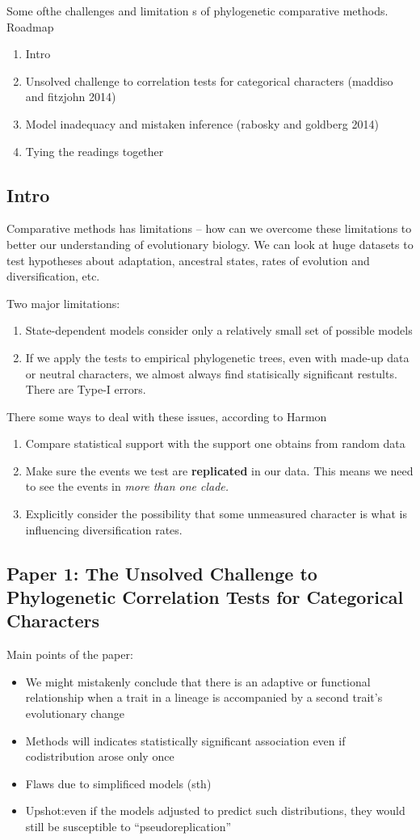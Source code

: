 \documentclass{article}
\begin{document}
Some ofthe challenges and limitation s of phylogenetic comparative methods.
Roadmap
\begin{enumerate}
\item Intro
\item Unsolved challenge to correlation tests for categorical characters
(maddiso and fitzjohn 2014)
\item Model inadequacy and mistaken inference (rabosky and goldberg 2014)
\item Tying the readings together
\end{enumerate}

\subsection{Intro}
Comparative methods has limitations -- how can we overcome these limitations to
better our understanding of evolutionary biology. We can look at huge datasets
to test hypotheses  about adaptation, ancestral states, rates of evolution and
diversification, etc.

Two major limitations:
\begin{enumerate}
\item State-dependent models consider only a relatively small set of possible
models
\item If we apply the tests to empirical phylogenetic trees, even with made-up
data or neutral characters, we almost always find statisically significant
restults. There are Type-I errors.
\end{enumerate}
There some ways to deal with these issues, according to Harmon
\begin{enumerate}
\item Compare statistical support with the support one obtains from random data
\item Make sure the events we test are \textbf{replicated} in our data. This
means we need to see the events in \textit{more than one clade.}
\item Explicitly consider the possibility that some unmeasured character is what
is influencing diversification rates. 
\end{enumerate}

\subsection{Paper 1: The Unsolved Challenge to Phylogenetic Correlation Tests
  for Categorical Characters}
Main points of the paper:
\begin{itemize}
\item We might mistakenly conclude that there is an adaptive or functional
relationship when a trait in a lineage is accompanied by a second trait's
evolutionary change
\item Methods will indicates statistically significant association even if
codistribution arose only once
\item Flaws due to simplificed models (sth)
\item Upshot:even if the models adjusted to predict such distributions, they
would still be susceptible to ``pseudoreplication''
\end{itemize}
\end{document}
